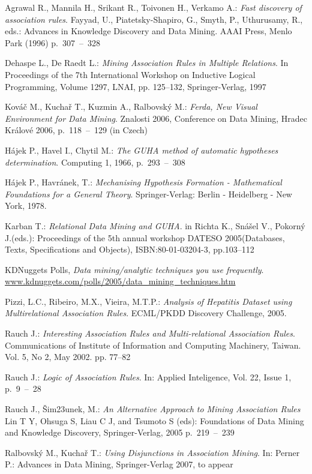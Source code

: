 \documentclass[conference]{IEEEtran}
\begin{document}
\begin{thebibliography}{1}

Agrawal R., Mannila H., Srikant R., Toivonen H., Verkamo A.:
\emph{Fast discovery of association rules}. Fayyad, U., Piatetsky-Shapiro, G., Smyth, 
P., Uthurusamy, R., eds.: Advances in Knowledge Discovery and Data Mining. AAAI Press, 
Menlo Park (1996) p.~307~--~328

Dehaspe L., De Raedt L.:
\emph{Mining Association Rules in Multiple Relations}. In Proceedings of the 7th
International Workshop on Inductive Logical Programming, Volume 1297, LNAI,
pp. 125--132, Springer-Verlag, 1997

Kov\'{a}\v{c} M., Kucha\v{r} T., Kuzmin A., Ralbovsk\'{y} M.: \emph{Ferda, 
New Visual Environment for Data Mining}. Znalosti 2006, 
Conference on Data Mining, Hradec Kr\'{a}lov\'{e} 2006, p.~118~--~129 (in Czech)

H\'{a}jek P., Havel I., Chytil M.: \emph{The GUHA method of
automatic hypotheses determination}. Computing 1, 1966, p.~293~--~308

H\'{a}jek P., Havr\'{a}nek, T.: \emph{Mechanising Hypothesis
Formation - Mathematical  Foundations  for  a   General  Theory}.
Springer-Verlag: Berlin  - Heidelberg - New York, 1978.

Karban T.: \emph{Relational Data Mining and GUHA}. in Richta K., 
Sn\'{a}\v{s}el V., Pokorn\'{y} J.(eds.): Proceedings of the 5th annual
workshop DATESO 2005(Databases, Texts, Specifications and Objects),
ISBN:80-01-03204-3, pp.103--112

KDNuggets Polls, \emph{Data mining/analytic techniques you use frequently}.
\url{www.kdnuggets.com/polls/2005/data_mining_techniques.htm}

Pizzi, L.C., Ribeiro, M.X., Vieira, M.T.P.:
\emph{Analysis of Hepatitis Dataset using Multirelational Association Rules}. 
ECML/PKDD Discovery Challenge, 2005.

Rauch J.: \emph{Interesting Association Rules and Multi-relational Association
Rules}. Communications of Institute of Information and Computing Machinery, Taiwan.
Vol. 5, No 2, May 2002. pp. 77--82

Rauch J.: \emph{Logic of Association Rules}. In: Applied Inteligence, Vol. 22,
Issue 1, p.~9~--~28

Rauch J., \v{S}im\accent23unek, M.: \emph{An Alternative Approach to Mining
Association Rules} Lin T Y, Ohsuga S, Liau C J, and Tsumoto S (eds):
Foundations of Data Mining and Knowledge Discovery, Springer-Verlag, 2005
p.~219~--~239

Ralbovsk\'{y} M., Kucha\v{r} T.: 
\emph{Using Disjunctions in Association Mining}. 
In: Perner P.: Advances in Data Mining, Springer-Verlag 2007, to appear

\end{thebibliography}

\end{document}
